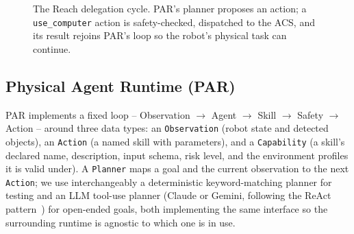 \documentclass{article}
\begin{document}
\begin{figure}[t]
\centering
{}
\caption{The Reach delegation cycle. PAR's planner proposes an action; a \texttt{use\_computer} action is safety-checked, dispatched to the ACS, and its result rejoins PAR's loop so the robot's physical task can continue.}
\label{fig:cycle}
\end{figure}

\subsection{Physical Agent Runtime (PAR)}
PAR implements a fixed loop -- Observation $\rightarrow$ Agent $\rightarrow$ Skill $\rightarrow$ Safety $\rightarrow$ Action -- around three data types: an \texttt{Observation} (robot state and detected objects), an \texttt{Action} (a named skill with parameters), and a \texttt{Capability} (a skill's declared name, description, input schema, risk level, and the environment profiles it is valid under). A \texttt{Planner} maps a goal and the current observation to the next \texttt{Action}; we use interchangeably a deterministic keyword-matching planner for testing and an LLM tool-use planner (Claude or Gemini, following the ReAct pattern~\citep{yao2023react}) for open-ended goals, both implementing the same interface so the surrounding runtime is agnostic to which one is in use.
\end{document}
